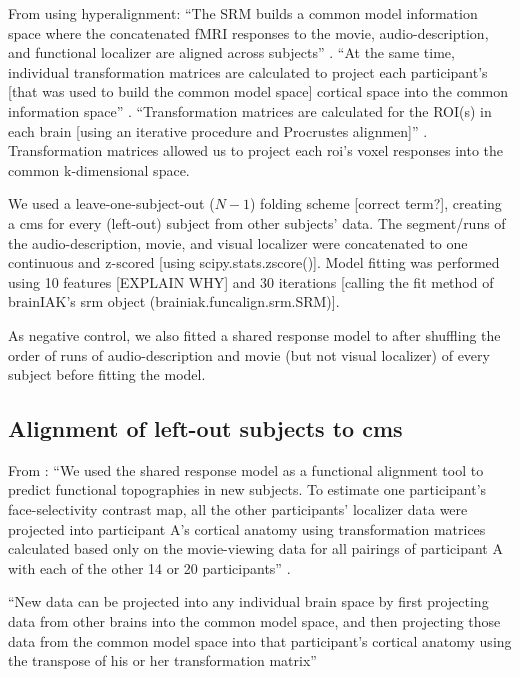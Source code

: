 %
From \citep{jiahui2020predicting} using hyperalignment: ``The SRM builds a
common model information space where the concatenated fMRI responses to the
movie, audio-description, and functional localizer are aligned across subjects''
\citep{jiahui2020predicting}.
%
``At the same time, individual transformation matrices are calculated to project
each participant's [that was used to build the common model space] cortical
space into the common information space'' \citep{jiahui2020predicting}.
%
``Transformation matrices are calculated for the ROI(s) in each brain [using an
iterative procedure and Procrustes alignmen]'' \citep{jiahui2020predicting}.
%
Transformation matrices allowed us to project each \ac{roi}'s voxel responses
into the common k-dimensional space.

We used a leave-one-subject-out ($N-1$) folding scheme [correct term?], creating
a \ac{cms} for every (left-out) subject from other subjects' data.
%
The segment/runs of the audio-description, movie, and visual localizer were
concatenated to one continuous and z-scored [using scipy.stats.zscore()].
Model fitting was performed using 10 features [EXPLAIN WHY] and 30 iterations
[calling the fit method of brainIAK's srm object (brainiak.funcalign.srm.SRM)].

As negative control, we also fitted a shared response model to after shuffling
the order of runs of audio-description and movie (but not visual localizer) of
every subject before fitting the model.


\subsection{Alignment of left-out subjects to \ac{cms}}

%
From \citep{jiahui2020predicting}: ``We used the shared response model as a
functional alignment tool to predict functional topographies in new subjects. To
estimate one participant's face-selectivity contrast map, all the other
participants' localizer data were projected into participant A's cortical
anatomy using transformation matrices calculated based only on the movie-viewing
data for all pairings of participant A with each of the other 14 or 20
participants'' \citep{jiahui2020predicting}.

%
%
``New data can be projected into any individual brain space by first projecting
data from other brains into the common model space, and then projecting those
data from the common model space into that participant's cortical anatomy using
the transpose of his or her transformation matrix'' \citep{jiahui2020predicting}


